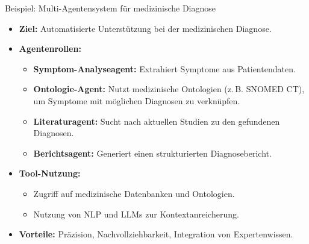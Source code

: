 \documentclass[aspectratio=1610, xcolor=dvipsnames, 9pt]{beamer}
\begin{document}
\begin{frame}{Beispiel: Multi-Agentensystem für medizinische Diagnose}
  \begin{itemize}
    \item \textbf{Ziel:} Automatisierte Unterstützung bei der medizinischen Diagnose.
    \item \textbf{Agentenrollen:}
      \begin{itemize}
        \item \textbf{Symptom-Analyseagent:} Extrahiert Symptome aus Patientendaten.
        \item \textbf{Ontologie-Agent:} Nutzt medizinische Ontologien (z. B. SNOMED CT), um Symptome mit möglichen Diagnosen zu verknüpfen.
        \item \textbf{Literaturagent:} Sucht nach aktuellen Studien zu den gefundenen Diagnosen.
        \item \textbf{Berichtsagent:} Generiert einen strukturierten Diagnosebericht.
      \end{itemize}
    \item \textbf{Tool-Nutzung:}
      \begin{itemize}
        \item Zugriff auf medizinische Datenbanken und Ontologien.
        \item Nutzung von NLP und LLMs zur Kontextanreicherung.
      \end{itemize}
    \item \textbf{Vorteile:} Präzision, Nachvollziehbarkeit, Integration von Expertenwissen.
  \end{itemize}
\end{frame}
\end{document}
